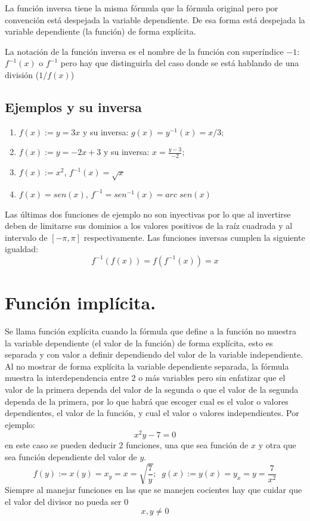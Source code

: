 \documentclass[oneside,spanish,letterpaper]{extbook}
\theoremstyle{mythmstyle}
\begin{document}
La función inversa tiene la misma fórmula que la fórmula original pero por convención
está despejada la variable dependiente. De esa forma está despejada la variable dependiente (la función) de 
forma explícita.

La notación de la función inversa es el nombre de la función con superíndice $-1$: $f^{-1}(x)$ o $f^{-1}$ 
pero hay que distinguirla del caso donde se está hablando de una división ($1/f(x)$)
 \subsection*{Ejemplos y su inversa}
 \begin{enumerate}
  \item $f(x):=y=3x$ y su inversa: $g(x)=y^{-1}(x)=x/3;$
  \item $f(x):=y=-2x+3$ y su inversa: $x=\frac{y-3}{-2};$
  \item $f(x):=x^2$,  $f^{-1}(x)=\sqrt{x}$
  \item $f(x)=sen(x)$, $f^{-1}=sen^{-1}(x)=arc\;sen(x)$
 \end{enumerate}
 Las últimas dos funciones de ejemplo no son inyectivas por lo que al invertirse deben de limitarse sus dominios a 
 los valores positivos de la raíz cuadrada y al intervalo de $[-\pi,\pi ]$ respectivamente.
 Las funciones inversas cumplen la siguiente igualdad:
 $$f^{-1}(f(x))=f(f^{-1}(x))=x$$
 
\section{Función implícita.}
Se llama función explícita cuando la fórmula que define a la función no muestra la variable dependiente (el valor
de la función) de forma explícita, esto es separada y con valor a definir dependiendo del valor de la
variable independiente. Al no mostrar de forma explícita la variable dependiente separada, la fórmula muestra 
la interdependencia entre 2 o más variables pero sin enfatizar que el valor de la primera dependa del valor de la 
segunda o que el valor de la segunda dependa de la primera, por lo que habrá que escoger cual es el valor o valores
dependientes, el valor de la función, y cual el valor o valores independientes. Por ejemplo:
$$x^2y-7=0$$
en este caso se pueden deducir 2 funciones, una que sea función de $x$ y otra que sea función dependiente del valor de $y$.
$$f(y):=x(y)=x_y=x=\sqrt{\frac{7}{y}};\;\;g(x):=y(x)=y_x=y=\frac{7}{x^2}$$
Siempre al manejar funciones en las que se manejen cocientes hay que cuidar que el valor del divisor no pueda ser $0$
$$x, y\neq 0 $$
\end{document}

